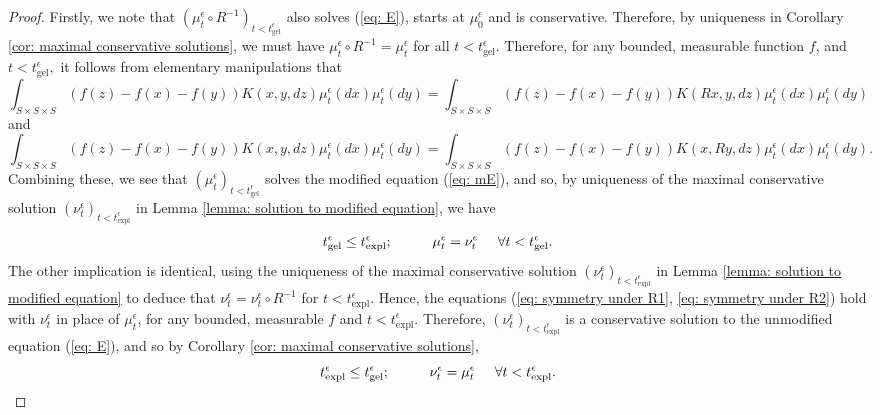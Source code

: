 \begin{proof} Firstly, we note that $( \mu^\epsilon_t \circ R^{-1})_{t<t_\mathrm{gel}^\epsilon}$ also solves (\ref{eq: E}), starts at $\mu^\epsilon_0$ and is conservative. Therefore, by uniqueness in Corollary \ref{cor: maximal conservative solutions}, we must have $\mu^\epsilon_t \circ R^{-1}=\mu^\epsilon_t$ for all $t<t_\mathrm{gel}^\epsilon.$ Therefore, for any bounded, measurable function $f$, and $t<t^\epsilon_\mathrm{gel},$ it follows from elementary manipulations that \begin{equation}\label{eq: symmetry under R1}
        \int_{S\times S\times S} (f(z)-f(x)-f(y))K(x,y,dz)\mu^\epsilon_t(dx)\mu^\epsilon_t(dy) =  \int_{S\times S\times S} (f(z)-f(x)-f(y))K(Rx,y,dz)\mu^\epsilon_t(dx)\mu^\epsilon_t(dy)
    \end{equation} and
\begin{equation}\label{eq: symmetry under R2}
        \int_{S\times S\times S} (f(z)-f(x)-f(y))K(x,y,dz)\mu^\epsilon_t(dx)\mu^\epsilon_t(dy) =  \int_{S\times S\times S} (f(z)-f(x)-f(y))K(x,Ry,dz)\mu^\epsilon_t(dx)\mu^\epsilon_t(dy).
    \end{equation} Combining these, we see that $(\mu^\epsilon_t)_{t<t^\epsilon_\mathrm{gel}}$ solves the modified equation (\ref{eq: mE}), and so, by uniqueness of the maximal conservative solution $(\nu^\epsilon_t)_{t<t_\mathrm{expl}^\epsilon}$ in Lemma \ref{lemma: solution to modified equation}, we have \begin{equation}
        t^\epsilon_\mathrm{gel} \leq t_\mathrm{expl}^\epsilon; \hspace{1cm} \mu^\epsilon_t=\nu^\epsilon_t \hspace{0.5cm}\forall t<t^\epsilon_\mathrm{gel}.
    \end{equation} The other implication is identical, using the uniqueness of the maximal conservative solution $(\nu^\epsilon_t)_{t<t_\mathrm{expl}^\epsilon}$ in Lemma \ref{lemma: solution to modified equation} to deduce that $\nu^\epsilon_t= \nu^\epsilon_t\circ R^{-1}$ for $t<t_\mathrm{expl}^\epsilon$. Hence, the equations (\ref{eq: symmetry under R1}, \ref{eq: symmetry under R2}) hold with $\nu^\epsilon_t$ in place of $\mu^\epsilon_t$, for any bounded, measurable $f$ and $t<t_\mathrm{expl}^\epsilon.$ Therefore, $(\nu^\epsilon_t)_{t<t_\mathrm{expl}^\epsilon}$ is a conservative solution to the unmodified equation (\ref{eq: E}), and so by Corollary \ref{cor: maximal conservative solutions}, \begin{equation}
        t_\mathrm{expl}^\epsilon \leq t^\epsilon_\mathrm{gel}; \hspace{1cm} \nu^\epsilon_t=\mu^\epsilon_t \hspace{0.5cm}\forall t<t_\mathrm{expl}^\epsilon.
    \end{equation} \end{proof}  

